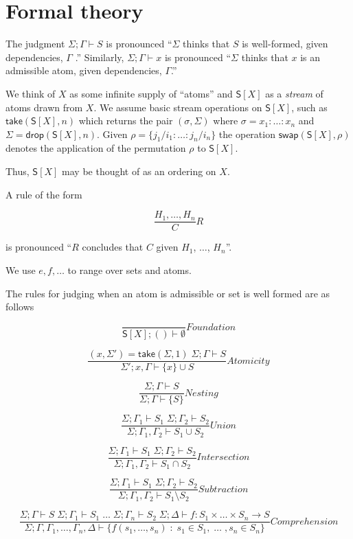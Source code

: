\section{Formal theory}
The judgment \(\Sigma; \Gamma \vdash S\) is pronounced
``\(\Sigma\) thinks that \(S\) is well-formed, given
dependencies, \(\Gamma\) .'' Similarly,
\(\Sigma; \Gamma \vdash x\) is pronounced
``\(\Sigma\) thinks that \(x\) is an admissible atom, given
dependencies, \(\Gamma\).''

We think of $X$ as some infinite supply of ``atoms'' and
$\mathsf{S}[X]$ as a \emph{stream} of atoms drawn from $X$. We assume
basic stream operations on $\mathsf{S}[X]$, such as
$\mathsf{take}(\mathsf{S}[X],n)$ which returns the pair
$(\sigma,\Sigma)$ where $\sigma = x_{1}:\ldots:x_{n}$ and $\Sigma = \mathsf{drop}(\mathsf{S}[X],n)$. Given $\rho = \{j_{1}/i_{1}:\ldots:j_{n}/i_{n}\}$ the operation
$\mathsf{swap}(\mathsf{S}[X],\rho)$ denotes the application of the
permutation $\rho$ to $\mathsf{S}[X]$.

Thus, $\mathsf{S}[X]$ may be thought of as an ordering on $X$.

A rule of the form

\[\frac{ H_1, \ldots , H_n }{ C }R\]

is pronounced ``\(R\) concludes that \(C\) given \(H_1\), \(\ldots\),
\(H_n\)''.

We use $e,f,\ldots$ to range over sets and atoms.

The rules for judging when an atom is admissible or set is well
formed are as follows

\[\frac{ }{ \mathsf{S}[X]; () \vdash \emptyset}Foundation\]

\[\frac{ (x,\Sigma') = \mathsf{take}(\Sigma,1) \; \Sigma; \Gamma \vdash S}{ \Sigma'; x,\Gamma \vdash \{ x \} \cup S}Atomicity\]

\[\frac{ \Sigma; \Gamma \vdash S }{ \Sigma; \Gamma \vdash \{ S \}}Nesting\]

\[\frac{ \Sigma; \Gamma_1 \vdash S_1 \; \Sigma; \Gamma_2 \vdash S_2}{ \Sigma; \Gamma_1, \Gamma_2 \vdash S_1 \cup S_2}Union\]

\[\frac{ \Sigma; \Gamma_1 \vdash S_1 \; \Sigma; \Gamma_2 \vdash S_2}{ \Sigma; \Gamma_1, \Gamma_2 \vdash S_1 \cap S_2}Intersection\]

\[\frac{ \Sigma; \Gamma_1 \vdash S_1 \; \Sigma; \Gamma_2 \vdash S_2}{ \Sigma; \Gamma_1, \Gamma_2 \vdash S_1 \setminus S_2}Subtraction\]

\[\frac{ \Sigma; \Gamma \vdash S \; \Sigma; \Gamma_{1} \vdash S_{1} \;\ldots\; \Sigma; \Gamma_{n} \vdash S_{2}\; \Sigma; \Delta \vdash f : S_{1} \times \ldots \times S_{n} \to S }{ \Sigma; \Gamma,\Gamma_{1},\ldots, \Gamma_{n},\Delta \vdash \{ f(s_{1},\ldots,s_{n}) \; : \; s_1 \in S_{1},\; \ldots\;, s_{n} \in S_{n}\}}Comprehension\]

